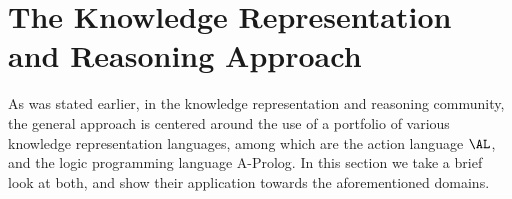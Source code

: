 \section{The Knowledge Representation and Reasoning Approach}

As was stated earlier, in the knowledge representation and reasoning community, the general approach is centered around the use of a portfolio of various knowledge representation languages, among which are the action language $\AL$, and the logic programming language A-Prolog. In this section we take a brief look at both, and show their application towards the aforementioned domains.